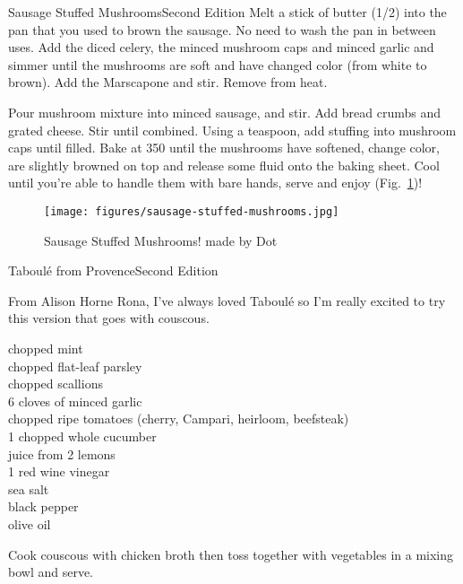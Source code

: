 \begin{entry}{Sausage Stuffed Mushrooms}{Second Edition}
Melt a stick of butter (\SI{1/2}{\cup}) into the pan that you used to brown the
sausage. No need to wash the pan in between uses. Add the diced celery, the
minced mushroom caps and minced garlic and simmer until the mushrooms are soft
and have changed color (from white to brown). Add the Marscapone and stir.
Remove from heat.

Pour mushroom mixture into minced sausage, and stir. Add bread crumbs and grated
cheese. Stir until combined. Using a teaspoon, add stuffing into mushroom caps
until filled. Bake at \SI{350}{\degreeF} until the mushrooms have softened,
change color, are slightly browned on top and release some fluid onto the baking
sheet. Cool until you're able to handle them with bare hands, serve and enjoy (Fig.~\ref{fig:sausage-stuffed-mushrooms})!
\begin{figure}
    \centering
    \texttt{[image: figures/sausage-stuffed-mushrooms.jpg]}
    \caption{Sausage Stuffed Mushrooms! made by Dot}
    \label{fig:sausage-stuffed-mushrooms}
\end{figure}
\end{entry}

\begin{entry}{Taboul\'{e} from Provence}{Second Edition}

\begin{open}
  From Alison Horne Rona, I've always loved Taboul\'{e} so I'm really excited to try
  this version that goes with couscous.
\end{open}
\begin{ingredients}
    chopped mint\\
    chopped flat-leaf parsley\\
    chopped scallions\\
    6 cloves of minced garlic\\
    chopped ripe tomatoes (cherry, Campari, heirloom, beefsteak)\\
    1 chopped whole cucumber\\
    juice from 2 lemons\\
    \SI{1}{\tblspoon} red wine vinegar\\
    sea salt\\
    black pepper\\
    olive oil
\end{ingredients}
Cook couscous with chicken broth then toss together with vegetables in a
mixing bowl and serve.
\end{entry}

